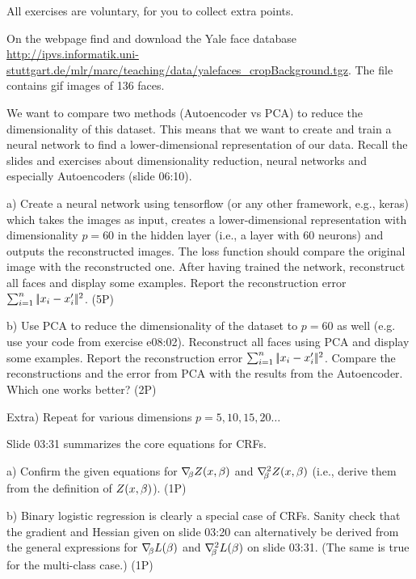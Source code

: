 

\renewcommand{\course}{Machine Learning}
\renewcommand{\exnum}{12}

\exercises

All exercises are voluntary, for you to collect extra points.



On the webpage find and download the Yale face database
{\tiny\url{http://ipvs.informatik.uni-stuttgart.de/mlr/marc/teaching/data/yalefaces_cropBackground.tgz}}. The
file contains gif images of 136 faces.

We want to compare two methods (Autoencoder vs PCA) to reduce the dimensionality
of this dataset. This means that we want to create and train a neural network to
find a lower-dimensional representation of our data. Recall the slides and exercises
about dimensionality reduction, neural networks and especially Autoencoders
(slide 06:10).

a) Create a neural network using tensorflow (or any other framework, e.g., keras) which
takes the images as input, creates a lower-dimensional representation with dimensionality
$p=60$ in the hidden layer (i.e., a layer with $60$ neurons) and outputs the reconstructed
images. The loss function should compare the original image with the reconstructed
one. After having trained the network, reconstruct all faces and display some examples.
Report the reconstruction error $\sum_{i=1}^n \norm{x_i - x'_i}^2$. (5P)

b) Use PCA to reduce the dimensionality of the dataset to $p=60$ as well (e.g. use your
code from exercise e08:02). Reconstruct all faces using PCA and display some examples.
Report the reconstruction error $\sum_{i=1}^n \norm{x_i - x'_i}^2$. Compare the
reconstructions and the error from PCA with the results from the Autoencoder. Which
one works better? (2P)

Extra) Repeat for various dimensions $p=5, 10, 15, 20\ldots$



Slide 03:31 summarizes the core equations for CRFs.

a) Confirm the given equations for $\na_\b Z(x,\b)$ and $\he[\b]
Z(x,\b)$ (i.e., derive them from the definition of $Z(x,\b)$). (1P)

b) Binary logistic regression is clearly a special case of
CRFs. Sanity check that the gradient and Hessian given on slide 03:20
can alternatively be derived from the general expressions for $\na_\b L(\b)$ and
$\he[\b] L(\b)$ on slide 03:31. (The same is true for the multi-class case.) (1P)

